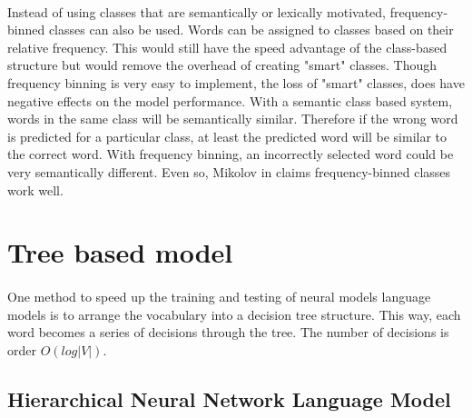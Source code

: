 \paragraph{}
Instead of using classes that are semantically or lexically motivated, frequency-binned classes can also be used. Words can be assigned to classes based on their relative frequency. This would still have the speed advantage of the class-based structure but would remove the overhead of creating "smart" classes. Though frequency binning is very easy to implement, the loss of "smart" classes, does have negative effects on the model performance. With a semantic class based system, words in the same class will be semantically similar. Therefore if the wrong word is predicted for a particular class, at least the predicted word will be similar to the correct word. With frequency binning, an incorrectly selected word could be very semantically different. Even so, Mikolov in \cite{Mikolov2012} claims frequency-binned classes work well. 

\section{Tree based model}
\paragraph{}
One method to speed up the training and testing of neural models language models is to arrange the vocabulary into a decision tree structure. This way, each word becomes a series of decisions through the tree. The number of decisions is order $O(log|V|)$.

\subsection{Hierarchical Neural Network Language Model}
